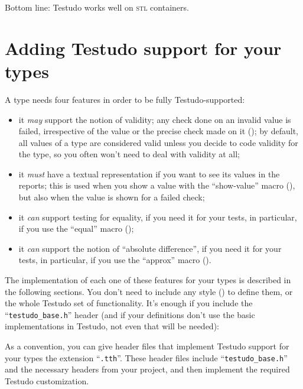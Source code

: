 \documentclass[twoside, a4paper, article]{memoir}
\providecommand\typesetexample[1]{%
}
\begin{document}
Bottom line: Testudo works well on \textsc{stl} containers.


\chapter{Adding Testudo support for your types}
\label{cha:adding-testudo-support-your-types}

A type needs four features in order to be fully Testudo-supported:
\begin{itemize}
\item it \emph{may} support the notion of validity; any check done on an
  invalid value is failed, irrespective of the value or the precise check made
  on it (); by default, all values of a type are
  considered valid unless you decide to code validity for the type, so you
  often won't need to deal with validity at all;
\item it \emph{must} have a textual representation if you want to see its
  values in the reports; this is used when you show a value with the
  ``show-value'' macro (), but also when the value
  is shown for a failed check;
\item it \emph{can} support testing for equality, if you need it for your
  tests, in particular, if you use the ``equal'' macro
  ();
\item it \emph{can} support the notion of ``absolute difference'', if you need
  it for your tests, in particular, if you use the ``approx'' macro
  ().
\end{itemize}

The implementation of each one of these features for your types is described in
the following sections.  You don't need to include any style
() to define them, or the
whole Testudo set of functionality.  It's enough if you include the
``\texttt{testudo\_base.h}'' header (and if your definitions don't use the
basic implementations in Testudo, not even that will be needed):

\typesetexample{include-testudo-base}

As a convention, you can give header files that implement Testudo support for
your types the extension ``\texttt{.tth}''.  These header files include
``\texttt{testudo\_base.h}'' and the necessary headers from your project, and
then implement the required Testudo customization.
\end{document}
